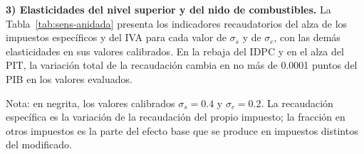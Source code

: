 \documentclass[11pt]{article}
\begin{document}
\textbf{3) Elasticidades del nivel superior y del nido de combustibles.} La Tabla~\ref{tab:sens-anidada} presenta los indicadores recaudatorios del alza de los impuestos específicos y del IVA para cada valor de $\sigma_{s}$ y de $\sigma_{c}$, con las demás elasticidades en sus valores calibrados. En la rebaja del IDPC y en el alza del PIT, la variación total de la recaudación cambia en no más de 0.0001 puntos del PIB en los valores evaluados.

\begin{table}[H]
\centering
\caption{Indicadores recaudatorios según las elasticidades de sustitución del nivel superior $\sigma_{s}$ y del nido de combustibles $\sigma_{c}$ (puntos del PIB nominal inicial y porcentaje)}
\label{tab:sens-anidada}
\small
{}
\par\smallskip
\begin{minipage}{\textwidth}
\footnotesize Nota: en negrita, los valores calibrados $\sigma_{s}=0.4$ y $\sigma_{c}=0.2$. La recaudación específica es la variación de la recaudación del propio impuesto; la fracción en otros impuestos es la parte del efecto base que se produce en impuestos distintos del modificado.
\end{minipage}
\end{table}
\end{document}
